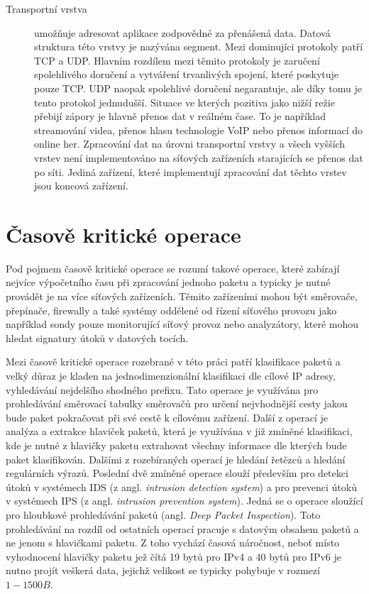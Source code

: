 \begin{description}
\item[Transportní vrstva]\label{layers:transport} %
umožňuje adresovat aplikace zodpovědné za přenášená data. Datová struktura této vrstvy
je nazývána segment. Mezi dominujíci protokoly patří TCP a UDP. Hlavním rozdílem mezi těmito protokoly
je zaručení spolehlivého doručení a vytváření trvanlivých spojení, které poskytuje pouze TCP.
UDP naopak spolehlivé doručení negarantuje, ale díky tomu je tento protokol jednudušší.
Situace ve kterých pozitiva jako
nižší režie přebijí zápory je hlavně přenos dat v reálném čase. To je například streamování videa,
přenos hlasu technologie VoIP nebo přenos informací do online her.
Zpracování dat na úrovni transportní vrstvy a všech vyšších vrstev není implementováno na síťových
zařízeních starajících se přenos dat po síti. Jediná zařízení, které implementují zpracování
dat těchto vrstev jsou koncová zařízení.

\end{description}

\section{Časově kritické operace} %
Pod pojmem časově kritické operace se rozumí takové operace, které zabírají nejvíce výpočetního
času při zpracování jednoho paketu a typicky je nutné provádět je na více síťových zařízeních.
Těmito zařízeními mohou být směrovače, přepínače, firewally a také systémy
oddělené od řízení síťového provozu jako například sondy pouze monitorující síťový provoz nebo analyzátory,
které mohou hledat signatury útoků v datových tocích.

Mezi časově kritické operace rozebrané v této práci patří klasifikace paketů a velký důraz je kladen na
jednodimenzionální klasifikaci dle cílové IP adresy, vyhledávání nejdelšího shodného prefixu.
Tato operace je využívána pro prohledávání směrovací tabulky směrovačů pro určení nejvhodnější cesty jakou
bude paket pokračovat při své cestě k cílovému zařízení.
Další z operací je analýza a extrakce hlaviček paketů, která je využívána v již zmíněné klasifikaci,
kde je nutné z hlavičky paketu extrahovat všechny informace dle kterých bude paket klasifikován.
Dalšími z rozebíraných operací je hledání řetězců a hledání regulárních výrazů.
Poslední dvě zmíněné operace slouží především pro detekci útoků v systémech IDS (z angl. \textit{intrusion detection system})
a pro prevenci útoků v systémech IPS (z angl. \textit{intrusion prevention system}). Jedná se o operace sloužící
pro hloubkové prohledávání paketů (angl. \textit{Deep Packet Inspection}). Toto prohledávání na rozdíl od ostatních operací
pracuje s datovým obsahem paketů a ne jenom s hlavičkami paketu. Z toho vychází časová náročnost,
neboť místo vyhodnocení hlavičky paketu jež čítá 19 bytů pro IPv4 a 40 bytů pro IPv6 je nutno
projít veškerá data, jejichž velikost se typicky pohybuje v rozmezí $1 - 1500B$.

